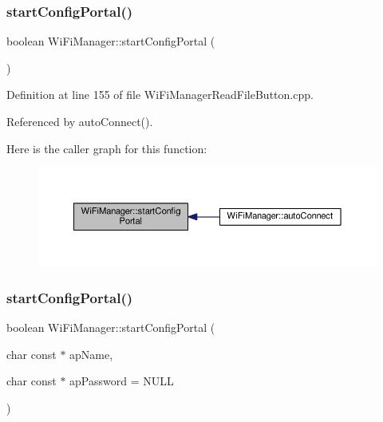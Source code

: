 \subsubsection{\texorpdfstring{start\+Config\+Portal()}{startConfigPortal()}\hspace{0.1cm}{\footnotesize\ttfamily [1/2]}}
{\footnotesize\ttfamily boolean Wi\+Fi\+Manager\+::start\+Config\+Portal (\begin{DoxyParamCaption}{ }\end{DoxyParamCaption})}



Definition at line 155 of file Wi\+Fi\+Manager\+Read\+File\+Button.\+cpp.



Referenced by auto\+Connect().

Here is the caller graph for this function\+:\nopagebreak
\begin{figure}[H]
\begin{center}
\leavevmode
\includegraphics[width=350pt]{d4/dc8/class_wi_fi_manager_ad781751307f7f623956126096a09a545_icgraph}
\end{center}
\end{figure}
\mbox{\label{class_wi_fi_manager_afaca5021edffb4d9a5bd39f7b0f7a686}} 
\subsubsection{\texorpdfstring{start\+Config\+Portal()}{startConfigPortal()}\hspace{0.1cm}{\footnotesize\ttfamily [2/2]}}
{\footnotesize\ttfamily boolean Wi\+Fi\+Manager\+::start\+Config\+Portal (\begin{DoxyParamCaption}\item[{char const $\ast$}]{ap\+Name,  }\item[{char const $\ast$}]{ap\+Password = {\ttfamily NULL} }\end{DoxyParamCaption})}




